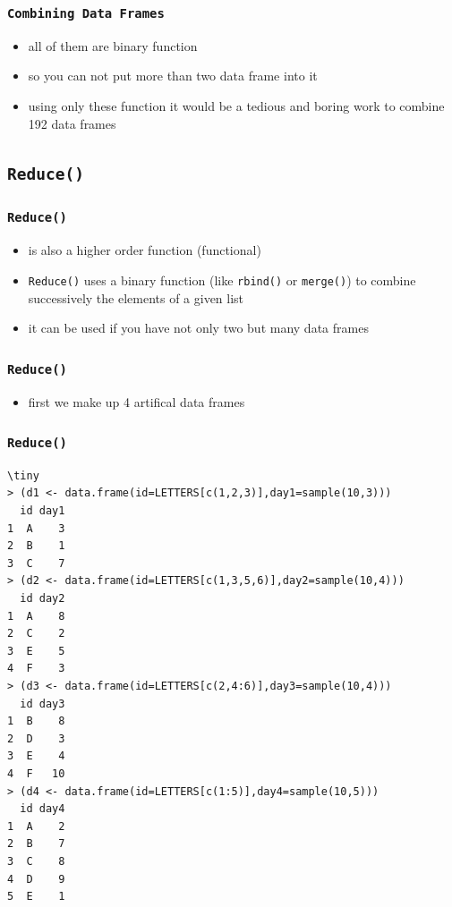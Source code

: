 \documentclass[xcolor={table},c]{beamer}
\begin{document}
\begin{frame}[fragile]\frametitle{\texttt{Combining Data Frames}}
\begin{itemize}
\item all of them are binary function
\item so you can not put more than two data frame into it
\item using only these function it would be a tedious and boring work to combine 192 data frames
\end{itemize}
\end{frame}


\subsection{\texttt{Reduce()}}
\begin{frame}[fragile]\frametitle{\texttt{Reduce()}}
\begin{itemize}
\item is also a higher order function (functional)
\item \texttt{Reduce()} uses a binary function (like \texttt{rbind()} or \texttt{merge()}) to combine successively the elements of a given list
\item it can be used if you have not only two but many data frames
\end{itemize}
\end{frame}


\begin{frame}[fragile]\frametitle{\texttt{Reduce()}}
  \begin{itemize}
  \item first we make up 4 artifical data frames
  \end{itemize}
\end{frame}


\begin{frame}[fragile]\frametitle{\texttt{Reduce()}}
\begin{verbatim}\tiny
> (d1 <- data.frame(id=LETTERS[c(1,2,3)],day1=sample(10,3)))
  id day1
1  A    3
2  B    1
3  C    7
> (d2 <- data.frame(id=LETTERS[c(1,3,5,6)],day2=sample(10,4)))
  id day2
1  A    8
2  C    2
3  E    5
4  F    3
> (d3 <- data.frame(id=LETTERS[c(2,4:6)],day3=sample(10,4)))
  id day3
1  B    8
2  D    3
3  E    4
4  F   10
> (d4 <- data.frame(id=LETTERS[c(1:5)],day4=sample(10,5)))
  id day4
1  A    2
2  B    7
3  C    8
4  D    9
5  E    1
\end{verbatim}
\end{frame}
\end{document}
